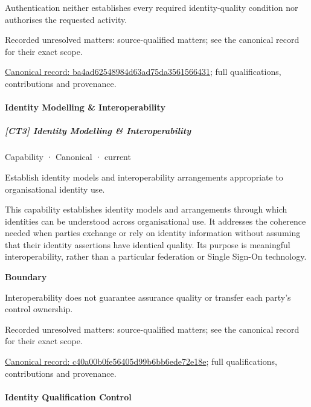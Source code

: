 Authentication neither establishes every required identity-quality condition nor authorises the requested activity.


{\small Recorded unresolved matters: source-qualified matters; see the canonical record for their exact scope.}\par
{\footnotesize \href{../../../../continuum/strategy/capability/ba4ad62548984d63ad75da3561566431.md}{Canonical record: ba4ad62548984d63ad75da3561566431}; full qualifications, contributions and provenance.}\par
\paragraph{Identity Modelling \& Interoperability}

\subparagraph{[CT3] Identity Modelling \& Interoperability}

\label{element:c40a00b0fe56405d99b6bb6ede72e18e}
{\small Capability · Canonical · current}\par

Establish identity models and interoperability arrangements appropriate to organisational identity use.



This capability establishes identity models and arrangements through which identities can be understood across organisational use. It addresses the coherence needed when parties exchange or rely on identity information without assuming that their identity assertions have identical quality. Its purpose is meaningful interoperability, rather than a particular federation or Single Sign-On technology.



\textbf{Boundary}



Interoperability does not guarantee assurance quality or transfer each party's control ownership.


{\small Recorded unresolved matters: source-qualified matters; see the canonical record for their exact scope.}\par
{\footnotesize \href{../../../../continuum/strategy/capability/c40a00b0fe56405d99b6bb6ede72e18e.md}{Canonical record: c40a00b0fe56405d99b6bb6ede72e18e}; full qualifications, contributions and provenance.}\par
\paragraph{Identity Qualification Control}

